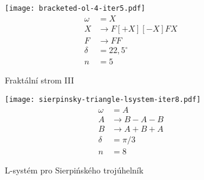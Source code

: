 \begin{figure}[p]
    \centering
    \texttt{[image: bracketed-ol-4-iter5.pdf]}
    \begin{align*}
        \omega&=X\\
        X&\to F[+X][-X]FX\\
        F&\to FF\\
        \delta&=22{,}5^\circ\\
        n&=5
    \end{align*}
    \caption{Fraktální strom III}
    \label{fig:lsystem-fraktalni-strom-iii}
\end{figure}
\begin{figure}[H]
    \centering
    \texttt{[image: sierpinsky-triangle-lsystem-iter8.pdf]}
    \begin{align*}
        \omega&=A\\
        A&\to B-A-B\\
        B&\to A+B+A\\
        \delta&=\pi/3\\
        n&=8
    \end{align*}
    \caption{L-systém pro Sierpińského trojúhelník}
    \label{fig:lsystem-sierpinskeho-trojúhelnik}
\end{figure}
